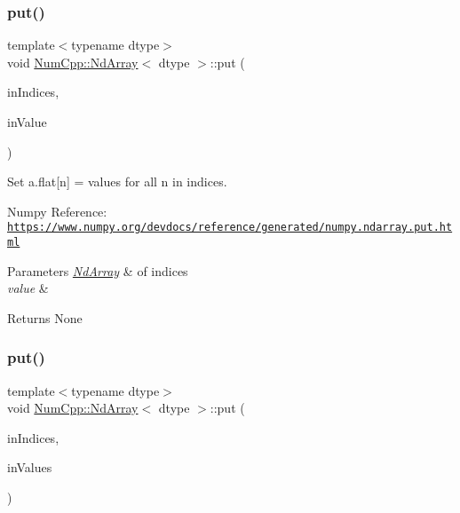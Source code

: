 \subsubsection{\texorpdfstring{put()}{put()}\hspace{0.1cm}{\footnotesize\ttfamily [3/12]}}
{\footnotesize\ttfamily template$<$typename dtype$>$ \\
void \mbox{\hyperlink{class_num_cpp_1_1_nd_array}{Num\+Cpp\+::\+Nd\+Array}}$<$ dtype $>$\+::put (\begin{DoxyParamCaption}\item[{const \mbox{\hyperlink{class_num_cpp_1_1_nd_array}{Nd\+Array}}$<$ \mbox{\hyperlink{namespace_num_cpp_a36f388e948380413c63011cab9b7fbd5}{uint32}} $>$ \&}]{in\+Indices,  }\item[{dtype}]{in\+Value }\end{DoxyParamCaption})\hspace{0.3cm}{\ttfamily [inline]}}

Set a.\+flat\mbox{[}n\mbox{]} = values for all n in indices.

Numpy Reference\+: \href{https://www.numpy.org/devdocs/reference/generated/numpy.ndarray.put.html}{\tt https\+://www.\+numpy.\+org/devdocs/reference/generated/numpy.\+ndarray.\+put.\+html}


\begin{DoxyParams}{Parameters}
{\em \mbox{\hyperlink{class_num_cpp_1_1_nd_array}{Nd\+Array}}} & of indices \\
\hline
{\em value} & \\
\hline
\end{DoxyParams}
\begin{DoxyReturn}{Returns}
None 
\end{DoxyReturn}
\mbox{\label{class_num_cpp_1_1_nd_array_ae62e28e74f0665ab01f3ad2984bf27e7}} 
\subsubsection{\texorpdfstring{put()}{put()}\hspace{0.1cm}{\footnotesize\ttfamily [4/12]}}
{\footnotesize\ttfamily template$<$typename dtype$>$ \\
void \mbox{\hyperlink{class_num_cpp_1_1_nd_array}{Num\+Cpp\+::\+Nd\+Array}}$<$ dtype $>$\+::put (\begin{DoxyParamCaption}\item[{const \mbox{\hyperlink{class_num_cpp_1_1_nd_array}{Nd\+Array}}$<$ \mbox{\hyperlink{namespace_num_cpp_a36f388e948380413c63011cab9b7fbd5}{uint32}} $>$ \&}]{in\+Indices,  }\item[{const \mbox{\hyperlink{class_num_cpp_1_1_nd_array}{Nd\+Array}}$<$ dtype $>$ \&}]{in\+Values }\end{DoxyParamCaption})\hspace{0.3cm}{\ttfamily [inline]}}

